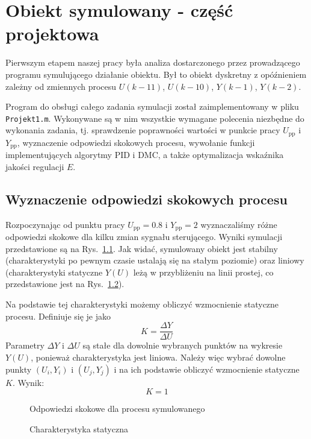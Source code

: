 \chapter{Obiekt symulowany - część projektowa}
Pierwszym etapem naszej pracy była analiza dostarczonego przez prowadzącego programu symulującego działanie obiektu. Był to obiekt dyskretny z opóźnieniem zależny od zmiennych procesu $U(k-11)$, $U(k-10)$, $Y(k-1)$, $Y(k-2)$.

Program do obsługi całego zadania symulacji został zaimplementowany w pliku \texttt{Projekt1.m}. Wykonywane są w nim wszystkie wymagane polecenia niezbędne do wykonania zadania, tj. sprawdzenie poprawności wartości w punkcie pracy $U_{\mathrm{pp}}$ i $Y_{\mathrm{pp}}$, wyznaczenie odpowiedzi skokowych procesu, wywołanie funkcji implementujących algorytmy PID i DMC, a także optymalizacja wskaźnika jakości regulacji $E$.

\section{Wyznaczenie odpowiedzi skokowych procesu}
Rozpoczynając od punktu pracy $U_{\mathrm{pp}}=\num{0,8}$ i $Y_{\mathrm{pp}}=2$ wyznaczaliśmy różne odpowiedzi skokowe dla kilku zmian sygnału sterującego. Wyniki symulacji przedstawione są na Rys.~\ref{os}. Jak widać, symulowany obiekt jest stabilny (charakterystyki po pewnym czasie ustalają się na stałym poziomie) oraz liniowy (charakterystyki statyczne $Y(U)$ leżą w przybliżeniu na linii prostej, co przedstawione jest na Rys.~\ref{cs}).

Na podstawie tej charakterystyki możemy obliczyć wzmocnienie statyczne procesu. Definiuje się je jako
\begin{equation}
K=\frac{\Delta Y}{\Delta U}
\end{equation}
Parametry $\Delta Y$ i $\Delta U$ są stałe dla dowolnie wybranych punktów na wykresie $Y(U)$, ponieważ charakterystyka jest liniowa. Należy więc wybrać dowolne punkty $(U_i, Y_i)$ i $(U_j, Y_j)$ i na ich podstawie obliczyć wzmocnienie statyczne $K$. Wynik:
\begin{equation}
K=1
\end{equation}

\begin{figure}
\centering
\caption{Odpowiedzi skokowe dla procesu symulowanego}

\label{os}
\end{figure}

\begin{figure}
\centering
\caption{Charakterystyka statyczna}

\label{cs}
\end{figure}

